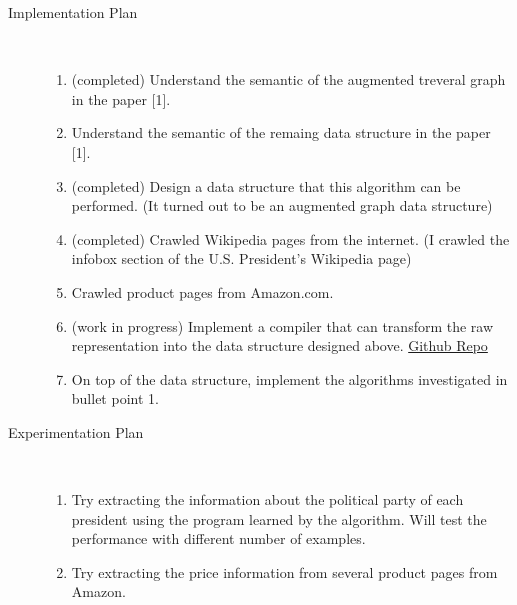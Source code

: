 \documentclass[12pt,a4paper]{article}
\begin{document}
\begin{description}
	\begin{description}
		\item[Implementation Plan]\text{}\\
		\begin{enumerate}
			\item (completed) Understand the semantic of the augmented treveral graph in the paper [1].
			\item Understand the semantic of the remaing data structure in the paper [1].
			\item (completed) Design a data structure that this algorithm can be performed. (It turned out to be an augmented graph data structure)
			\item (completed) Crawled Wikipedia pages from the internet. (I crawled the infobox section of the U.S. President's Wikipedia page) 
			\item Crawled product pages from Amazon.com.
			\item (work in progress) Implement a compiler that can transform the raw representation into the data structure designed above.
			\href{https://github.com/paul841029/NodeMatcher}{Github Repo}
			\item On top of the data structure, implement the algorithms investigated in bullet point 1. 
		\end{enumerate}
	\item[Experimentation Plan]\text{}\\
	\begin{enumerate}
		\item Try extracting the information about the political party of each president using the program learned by the algorithm. Will test the performance with different number of examples.
		\item Try extracting the price information from several product pages from Amazon.
	\end{enumerate}
	\end{description}
\end{description}
\nocite{Le2014FlashExtractAF} 
\nocite{yaghmazadeh2018automated}


\end{document}
